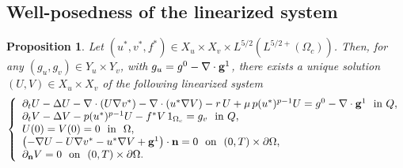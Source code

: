 \documentclass[11pt,reqno]{amsart}%
\newtheorem{proposition}[theorem]{Proposition}
\numberwithin{equation}{section}
\begin{document}
{ \subsection{Well-posedness of the linearized system}\label{linealizado}
 \par\noindent
  \begin{proposition}\label{v1}
Let $(u^*,v^*,f^*)\in X_u \times X_v\times L^{5/2}(L^{5/2+}(\Omega_c))$. 
Then, for any $(g_u,g_v)\in Y_u\times Y_v$, 
with $g_u=g^0-\nabla \cdot{\bf g}^1$, there exists a unique solution $(U,V)
\in   {X}_{u}\times {X}_{v}$ of the following linearized system
\begin{equation}
\left\{
\begin{array}{l}
\partial_tU-\Delta U-\nabla\cdot(U\nabla v^*)-\nabla\cdot(u^*\nabla V)
-r\, U+\mu \, p(u^*)^{p-1} U=g^0-\nabla \cdot{\bf g}^1\ \mbox{ in $Q$},\\
\partial_tV-\Delta V-p(u^*)^{p-1}U-f^*V\,1_{\Omega_c}=g_v\ \mbox{ in $Q $},\\
U(0)=V(0)=0\ \mbox{ in }\ \Omega,\\
\left(-\nabla U-U\nabla v^*-u^*\nabla V+{\bf g}^1\right)\cdot{\bf n}=0\ \mbox{ on }\ (0,T)\times\partial\Omega,\\
\partial_{\bf n}V=0\ \mbox{ on }\ (0,T)\times\partial\Omega.\label{eq1e0-1}
\end{array}
\right.
\end{equation}
 \end{proposition}
 
}
\end{document}
